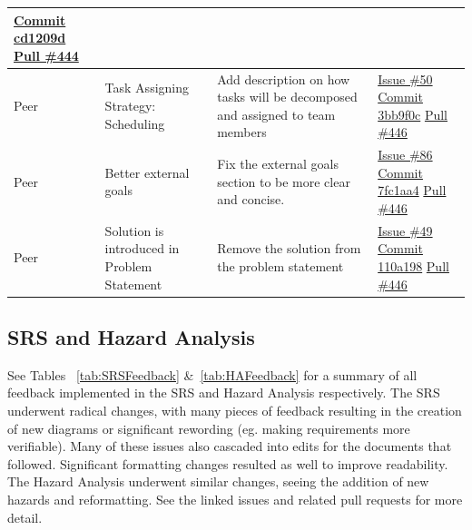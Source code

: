 \documentclass[12pt, titlepage]{article}
\begin{document}
\begin{longtable}{|p{2cm}|p{4cm}|p{5cm}|p{4cm}|}
\newline\href{https://github.com/OmarHassanAdelhamid/Five-of-a-Kind-capstone-project-/pull/444/changes/cd1209d5c6c940b486f220eadd54d603ed884723}{Commit cd1209d}
\newline\href{https://github.com/OmarHassanAdelhamid/Five-of-a-Kind-capstone-project-/pull/444}{Pull \#444} \\ \hline
Peer & Task Assigning Strategy: Scheduling & Add description on how tasks will be decomposed and assigned to team members & \href{https://github.com/OmarHassanAdelhamid/Five-of-a-Kind-capstone-project-/issues/50}{Issue \#50}
\newline\href{https://github.com/OmarHassanAdelhamid/Five-of-a-Kind-capstone-project-/commit/3bb9f0c1fd7892a7597d2a2a6df1fcd8c329bef6}{Commit 3bb9f0c}
\newline\href{https://github.com/OmarHassanAdelhamid/Five-of-a-Kind-capstone-project-/pull/446}{Pull \#446} \\ \hline
Peer & Better external goals & Fix the external goals section to be more clear and concise. & \href{https://github.com/OmarHassanAdelhamid/Five-of-a-Kind-capstone-project-/issues/86}{Issue \#86}
\newline\href{https://github.com/OmarHassanAdelhamid/Five-of-a-Kind-capstone-project-/commit/7fc1aa47cb32687a8a36d497c8a638528c3abe0a}{Commit 7fc1aa4}
\newline\href{https://github.com/OmarHassanAdelhamid/Five-of-a-Kind-capstone-project-/pull/446}{Pull \#446} \\ \hline

Peer & Solution is introduced in Problem Statement & Remove the solution from the problem statement & \href{https://github.com/OmarHassanAdelhamid/Five-of-a-Kind-capstone-project-/issues/49}{Issue \#49}
\newline\href{https://github.com/OmarHassanAdelhamid/Five-of-a-Kind-capstone-project-/commit/110a1986c88a6d9deb9f61ec53206be98b980ce6}{Commit 110a198}
\newline\href{https://github.com/OmarHassanAdelhamid/Five-of-a-Kind-capstone-project-/pull/446}{Pull \#446} \\ \hline
\end{longtable}

\subsection{SRS and Hazard Analysis}

See Tables ~\ref{tab:SRSFeedback} \&~\ref{tab:HAFeedback} for a summary of all feedback implemented in the SRS and Hazard Analysis respectively. 
The SRS underwent radical changes, with many pieces of feedback resulting in the creation of new diagrams or significant 
rewording (eg. making requirements more verifiable). Many of these issues also cascaded into edits for the documents that 
followed. Significant formatting changes resulted as well to improve readability. The Hazard Analysis underwent similar changes, 
seeing the addition of new hazards and reformatting. See the linked issues and related pull requests for more detail.
\end{document}
